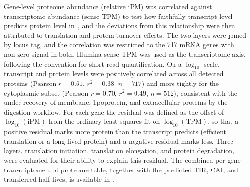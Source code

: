 Gene-level proteome abundance (relative iPM) was correlated against transcriptome abundance (sense TPM) to test how faithfully transcript level predicts protein level in~\syn, and the deviations from this relationship were then attributed to translation and protein-turnover effects.
The two layers were joined by locus tag, and the correlation was restricted to the 717 mRNA genes with non-zero signal in both.
Illumina sense TPM was used as the transcriptome axis, following the convention for short-read quantification.
On a $\log_{10}$ scale, transcript and protein levels were positively correlated across all detected proteins (Pearson $r = 0.61$, $r^{2} = 0.38$, $n = 717$) and more tightly for the cytoplasmic subset (Pearson $r = 0.70$, $r^{2} = 0.49$, $n = 512$), consistent with the under-recovery of membrane, lipoprotein, and extracellular proteins by the digestion workflow.
For each gene the residual was defined as the offset of $\log_{10}(\text{iPM})$ from the ordinary-least-squares fit on $\log_{10}(\text{TPM})$, so that a positive residual marks more protein than the transcript predicts (efficient translation or a long-lived protein) and a negative residual marks less.
Three layers, translation initiation, translation elongation, and protein degradation, were evaluated for their ability to explain this residual.
The combined per-gene transcriptome and proteome table, together with the predicted TIR, CAI, and transferred half-lives, is available in \sdomics.

